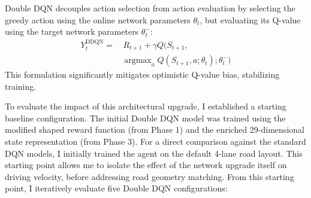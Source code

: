 \documentclass{article}
\begin{document}
Double DQN decouples action selection from action evaluation by selecting the greedy action using the online network parameters $\theta_t$, but evaluating its Q-value using the target network parameters $\theta^-_t$:
\begin{equation}
\begin{split}
    Y^{\text{DDQN}}_t = & \, R_{t+1} + \gamma Q\big(S_{t+1}, \\
    & \operatorname{argmax}_{a} Q(S_{t+1}, a; \theta_t); \theta^-_t\big)
\end{split}
\end{equation}
This formulation significantly mitigates optimistic Q-value bias, stabilizing training.

To evaluate the impact of this architectural upgrade, I established a starting baseline configuration. The initial Double DQN model was trained using the modified shaped reward function (from Phase 1) and the enriched 29-dimensional state representation (from Phase 3). For a direct comparison against the standard DQN models, I initially trained the agent on the default 4-lane road layout. This starting point allows me to isolate the effect of the network upgrade itself on driving velocity, before addressing road geometry matching. From this starting point, I iteratively evaluate five Double DQN configurations:
\end{document}
